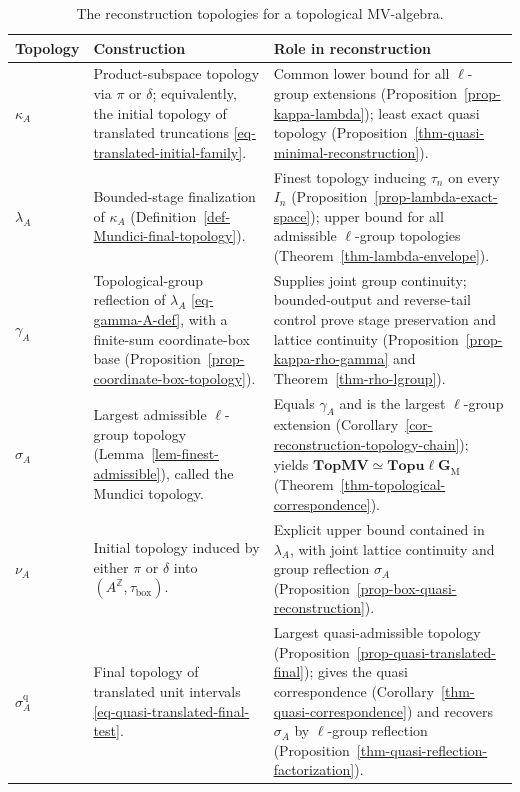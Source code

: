 \documentclass[preprint,3p]{elsarticle}
\theoremstyle{plain}
\theoremstyle{definition}
\newcommand{\TopMV}{\mathbf{TopMV}}
\newcommand{\TopulgM}{\mathbf{Topu\ell G}_{\mathrm{M}}}
\numberwithin{equation}{section}
\begin{document}
\begin{table}[!htb]
\centering
\small
\renewcommand{\arraystretch}{1.25}
\begin{tabular}{@{}>{\raggedright\arraybackslash}p{}
                  >{\raggedright\arraybackslash}p{}
                  >{\raggedright\arraybackslash}p{}@{}}
\hline
Topology & Construction & Role in reconstruction\\
\hline
$\kappa_A$ &
Product-subspace topology via $\pi$ or $\delta$;
equivalently, the initial topology of translated truncations
\eqref{eq-translated-initial-family}. &
Common lower bound for all $\ell$-group extensions
(Proposition~\ref{prop-kappa-lambda}); least exact quasi topology
(Proposition~\ref{thm-quasi-minimal-reconstruction}).\\
$\lambda_A$ &
Bounded-stage finalization of $\kappa_A$
(Definition~\ref{def-Mundici-final-topology}). &
Finest topology inducing $\tau_n$ on every $I_n$
(Proposition~\ref{prop-lambda-exact-space}); upper bound for all
admissible $\ell$-group topologies
(Theorem~\ref{thm-lambda-envelope}).\\
$\gamma_A$ &
Topological-group reflection of $\lambda_A$
\eqref{eq-gamma-A-def}, with a finite-sum coordinate-box base
(Proposition~\ref{prop-coordinate-box-topology}). &
Supplies joint group continuity; bounded-output and reverse-tail
control prove stage preservation and lattice continuity
(Proposition~\ref{prop-kappa-rho-gamma} and
Theorem~\ref{thm-rho-lgroup}).\\
$\sigma_A$ &
Largest admissible $\ell$-group topology
(Lemma~\ref{lem-finest-admissible}), called the Mundici topology. &
Equals $\gamma_A$ and is the largest $\ell$-group extension
(Corollary~\ref{cor-reconstruction-topology-chain}); yields
$\TopMV\simeq\TopulgM$
(Theorem~\ref{thm-topological-correspondence}).\\
$\nu_A$ &
Initial topology induced by either $\pi$ or $\delta$ into
$(A^{\mathbb Z},\tau_{\mathrm{box}})$. &
Explicit upper bound contained in $\lambda_A$, with joint lattice
continuity and group reflection $\sigma_A$
(Proposition~\ref{prop-box-quasi-reconstruction}).\\
$\sigma_A^{\mathrm q}$ &
Final topology of translated unit intervals
\eqref{eq-quasi-translated-final-test}. &
Largest quasi-admissible topology
(Proposition~\ref{prop-quasi-translated-final}); gives the quasi correspondence
(Corollary~\ref{thm-quasi-correspondence}) and recovers $\sigma_A$
by $\ell$-group reflection
(Proposition~\ref{thm-quasi-reflection-factorization}).\\
\hline
\end{tabular}
\caption{The reconstruction topologies for a topological MV-algebra.}
\label{tab-reconstruction-topologies}
\end{table}
\end{document}
